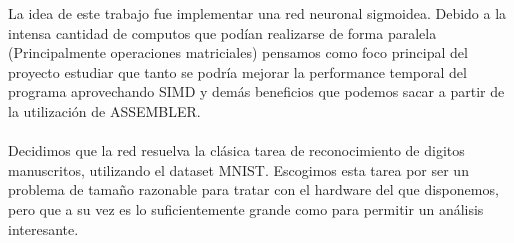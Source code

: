 
La idea de este trabajo fue implementar una red neuronal sigmoidea. Debido a la intensa cantidad de computos que podían realizarse de forma paralela (Principalmente operaciones matriciales) pensamos como foco principal del proyecto estudiar que tanto se podría mejorar la performance temporal del programa aprovechando SIMD y demás beneficios que podemos sacar a partir de la utilización de ASSEMBLER.
\\
\\
Decidimos que la red resuelva la clásica tarea de reconocimiento de digitos manuscritos, utilizando el dataset MNIST. Escogimos esta tarea por ser un problema de tamaño razonable para tratar con el hardware del que disponemos, pero que a su vez es lo suficientemente grande como para permitir un análisis interesante.